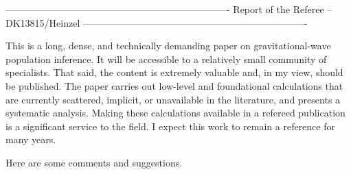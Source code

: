 ----------------------------------------------------------------------
Report of the Referee -- DK13815/Heinzel
----------------------------------------------------------------------

This is a long, dense, and technically demanding paper on gravitational-wave
population inference. It will be accessible to a relatively small community of
specialists. That said, the content is extremely valuable and, in my view,
should be published. The paper carries out low-level and foundational
calculations that are currently scattered, implicit, or unavailable in the
literature, and presents a systematic analysis. Making these calculations
available in a refereed publication is a significant service to the field. I
expect this work to remain a reference for many years.

Here are some comments and suggestions.

